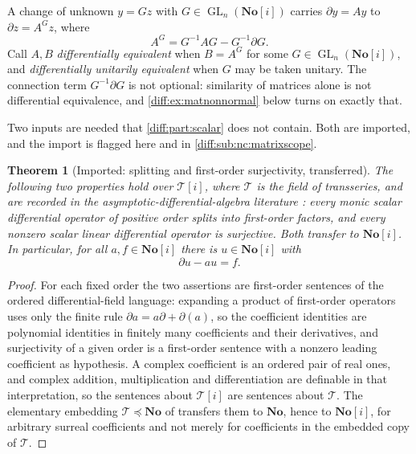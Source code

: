 \documentclass[11pt,letterpaper]{article}
\numberwithin{equation}{section}
\newtheorem{theorem}{Theorem}[section]
\theoremstyle{definition}
\theoremstyle{remark}
\newcommand{\No}{\mathbf{No}}
\newcommand{\SC}{\mathbf{No}[i]}
\newcommand{\der}{\partial}
\newcommand{\GL}{\operatorname{GL}}
\newcommand{\Tser}{\mathcal T}
\begin{document}
A change of unknown $y=Gz$ with $G\in\GL_{n}(\SC)$ carries $\der y=Ay$ to
$\der z=A^{G}z$, where
\begin{equation}\label{diff:eq:matgauge}
 A^{G}=G^{-1}AG-G^{-1}\der G .
\end{equation}
Call $A,B$ \emph{differentially equivalent} when $B=A^{G}$ for some
$G\in\GL_{n}(\SC)$, and \emph{differentially unitarily equivalent} when $G$
may be taken unitary. The connection term $G^{-1}\der G$ is not optional:
similarity of matrices alone is not differential equivalence, and
\cref{diff:ex:matnonnormal} below turns on exactly that.

Two inputs are needed that \cref{diff:part:scalar} does not contain. Both are
imported, and the import is flagged here and in
\cref{diff:sub:nc:matrixscope}.

\begin{theorem}[Imported: splitting and first-order surjectivity, transferred]
\label{diff:thm:matsurjectivity}
The following two properties hold over $\Tser[i]$, where $\Tser$ is the field of
transseries, and are recorded in the asymptotic-differential-algebra
literature \cite[Lemma 2.4.19]{ADHNorm}:
every monic scalar differential operator of positive order splits into
first-order factors, and every nonzero scalar linear differential operator is
surjective. Both transfer to $\SC$. In particular, for all $a,f\in\SC$ there
is $u\in\SC$ with
\begin{equation}\label{diff:eq:matfirstorder}
 \der u-au=f .
\end{equation}
\end{theorem}
\begin{proof}
For each fixed order the two assertions are first-order sentences of the
ordered differential-field language: expanding a product of first-order
operators uses only the finite rule $\der a=a\der+\der(a)$, so the coefficient
identities are polynomial identities in finitely many coefficients and their
derivatives, and surjectivity of a given order is a first-order sentence with
a nonzero leading coefficient as hypothesis. A complex coefficient is an
ordered pair of real ones, and complex addition, multiplication and
differentiation are definable in that interpretation, so the sentences about
$\Tser[i]$ are sentences about $\Tser$. The elementary embedding
$\Tser\preceq\No$ of \cite{ADH} transfers them to $\No$, hence to $\SC$, for
arbitrary surreal coefficients and not merely for coefficients in the embedded
copy of $\Tser$.
\end{proof}
\end{document}
